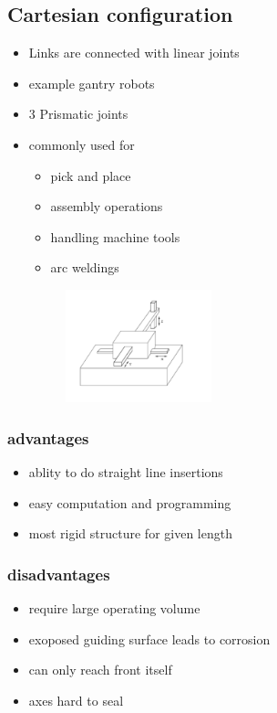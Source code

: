 \documentclass{article}
\begin{document}
\subsection{Cartesian configuration}
\begin{itemize}
	\item Links are connected with linear joints
	\item example gantry robots
	\item 3 Prismatic joints
	\item commonly used for
	      \begin{itemize}
		      \item pick and place
		      \item assembly operations
		      \item handling machine tools
		      \item arc weldings
	      \end{itemize}
	      \begin{figure}[htpb]
		      \centering
		      \includegraphics[width=0.4\textwidth]{cartesianRobot.png}
		      \caption{}
		      \label{fig:}
	      \end{figure}
\end{itemize}
\subsubsection{advantages}
\begin{itemize}
	\item ablity to do straight line insertions
	\item easy computation and programming
	\item most rigid structure for given length
\end{itemize}
\subsubsection{disadvantages}
\begin{itemize}
	\item require large operating volume
	\item exoposed guiding surface leads to corrosion
	\item can only reach front itself
	\item axes hard to seal
\end{itemize}
\end{document}
